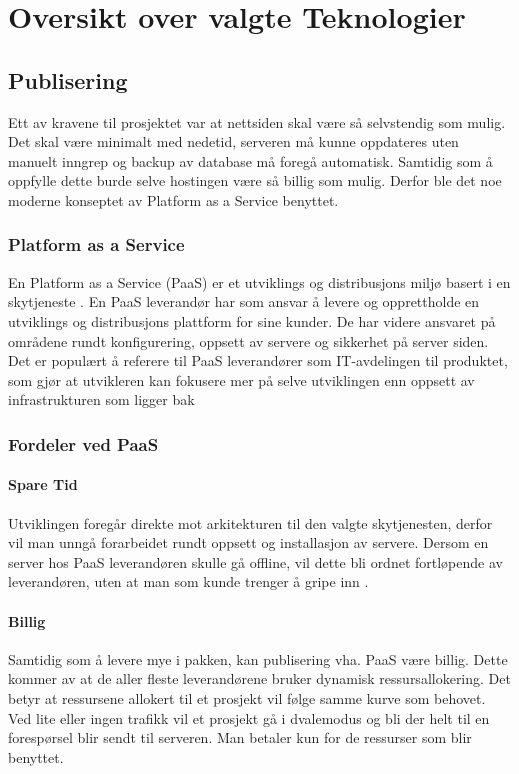\chapter{Oversikt over valgte Teknologier}

\section{Publisering}
Ett av kravene til prosjektet var at nettsiden skal være så selvstendig som mulig. Det skal være minimalt med nedetid, serveren må kunne oppdateres uten manuelt inngrep og backup av database må foregå automatisk. Samtidig som å oppfylle dette burde selve hostingen være så billig som mulig. Derfor ble det noe moderne konseptet av Platform as a Service benyttet.

\subsection{Platform as a Service}
En Platform as a Service (PaaS) er et utviklings og distribusjons miljø basert i en skytjeneste \cite{ paas:azure}. En PaaS leverandør har som ansvar å levere og opprettholde en utviklings og distribusjons plattform for sine kunder. De har videre ansvaret på områdene rundt konfigurering, oppsett av servere og sikkerhet på server siden. Det er populært å referere til  PaaS leverandører som IT-avdelingen til produktet, som gjør at utvikleren kan fokusere mer på selve utviklingen enn oppsett av infrastrukturen som ligger bak \cite[s. 10]{bachelor}

\subsection{Fordeler ved PaaS}
\subsubsection*{Spare Tid}
Utviklingen foregår direkte mot arkitekturen til den valgte skytjenesten, derfor vil man unngå forarbeidet rundt oppsett og installasjon av servere. Dersom en server hos PaaS leverandøren skulle gå offline, vil dette bli ordnet fortløpende av leverandøren, uten at man som kunde trenger å gripe inn \cite[s. 9]{bachelor}.

\subsubsection*{Billig}
Samtidig som å levere mye i pakken, kan publisering vha. PaaS være billig. Dette kommer av at de aller fleste leverandørene bruker dynamisk ressursallokering. Det betyr at ressursene allokert til et prosjekt vil følge samme kurve som behovet. Ved lite eller ingen trafikk vil et prosjekt gå i dvalemodus og bli der helt til en forespørsel blir sendt til serveren. Man betaler kun for de ressurser som blir benyttet.

